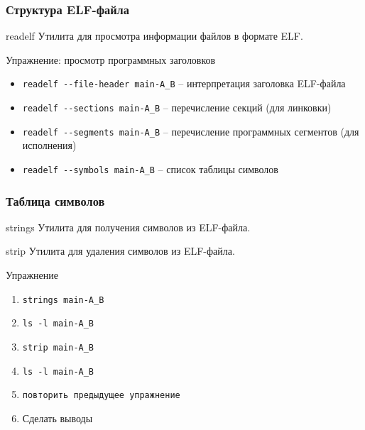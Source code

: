 \begin{frame}
	\frametitle{Структура ELF-файла}

	\begin{block}{readelf}
		Утилита для просмотра информации файлов в формате ELF.
	\end{block}

	\pause

	\begin{block}{Упражнение: просмотр программных заголовков}
		\begin{itemize}
			\item {\tt readelf -{}-file-header main-A\_B} -- интерпретация заголовка ELF-файла
			\item {\tt readelf -{}-sections main-A\_B} -- перечисление секций (для линковки)
			\item {\tt readelf -{}-segments main-A\_B} -- 
				перечисление программных сегментов (для исполнения)
			\item {\tt readelf -{}-symbols main-A\_B} -- список таблицы символов
		\end{itemize}
	\end{block}
\end{frame}

\begin{frame}
	\frametitle{Таблица символов}

	\begin{block}{strings}
		Утилита для получения символов из ELF-файла.
	\end{block}


	\begin{block}{strip}
		Утилита для удаления символов из ELF-файла.
	\end{block}

	\pause

	\begin{block}{Упражнение}
		\begin{enumerate}
			\item {\tt strings main-A\_B} 
			\item {\tt ls -l main-A\_B} 
			\item {\tt strip main-A\_B}
			\item {\tt ls -l main-A\_B}
			\item {\tt повторить предыдущее упражнение}
			\item Сделать выводы
		\end{enumerate}
	\end{block}

\end{frame}

